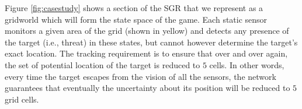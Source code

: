 Figure \ref{fig:casestudy} shows a section of the SGR that we represent as a gridworld which will form the state space of the game. Each static sensor monitors a given area of the grid (shown in yellow) and detects any presence of the target (i.e., threat) in these states, but cannot however determine the target's exact location. The tracking requirement is to ensure that over and over again, the set of potential location of the target is reduced to $5$ cells. In other words, every time the target escapes from the vision of all the sensors, the network guarantees that eventually the uncertainty about its position will be reduced to $5$ grid cells.

